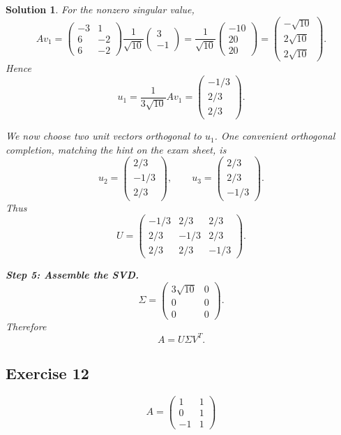\documentclass[11pt,a4paper]{article}
\theoremstyle{sol}
\newtheorem*{solution}{Solution}
\begin{document}
\begin{solution}
For the nonzero singular value,
\[
Av_1=
\begin{pmatrix}
-3&1\\
6&-2\\
6&-2
\end{pmatrix}
\frac{1}{\sqrt{10}}\begin{pmatrix}3\\-1\end{pmatrix}
=\frac{1}{\sqrt{10}}\begin{pmatrix}-10\\20\\20\end{pmatrix}
=\begin{pmatrix}-\sqrt{10}\\2\sqrt{10}\\2\sqrt{10}\end{pmatrix}.
\]
Hence
\[
u_1=\frac{1}{3\sqrt{10}}Av_1
=\begin{pmatrix}-1/3\\2/3\\2/3\end{pmatrix}.
\]

We now choose two unit vectors orthogonal to $u_1$. One convenient orthogonal completion, matching the hint on the exam sheet, is
\[
u_2=\begin{pmatrix}2/3\\-1/3\\2/3\end{pmatrix},
\qquad
u_3=\begin{pmatrix}2/3\\2/3\\-1/3\end{pmatrix}.
\]
Thus
\[
U=
\begin{pmatrix}
-1/3&2/3&2/3\\
2/3&-1/3&2/3\\
2/3&2/3&-1/3
\end{pmatrix}.
\]

\textbf{Step 5: Assemble the SVD.}
\[
\Sigma=
\begin{pmatrix}
3\sqrt{10}&0\\
0&0\\
0&0
\end{pmatrix}.
\]
Therefore
\[
\boxed{
A=U\Sigma V^T.
}
\]
\end{solution}

\clearpage
\subsection*{Exercise 12}
\[
A=\begin{pmatrix}1&1\\0&1\\-1&1\end{pmatrix}
\]
\end{document}
